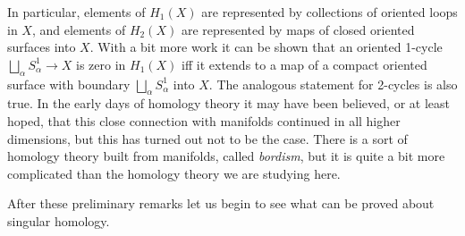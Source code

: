 In particular, elements of $H_1(X)$ are represented by collections of oriented loops
in $X$, and elements of $H_2(X)$ are represented by maps of closed oriented surfaces
into $X$. With a bit more work it can be shown that an oriented 1-cycle $\bigsqcup_\alpha S^1_\alpha \to X$ is
zero in $H_1(X)$ iff it extends to a map of a compact oriented surface with boundary
$\bigsqcup_\alpha S^1_\alpha$ into $X$. The analogous statement for 2-cycles is also true. In the early days of
homology theory it may have been believed, or at least hoped, that this close connection
with manifolds continued in all higher dimensions, but this has turned out not to
be the case. There is a sort of homology theory built from manifolds, called \textit{bordism},
but it is quite a bit more complicated than the homology theory we are studying here.

After these preliminary remarks let us begin to see what can be proved about
singular homology.


